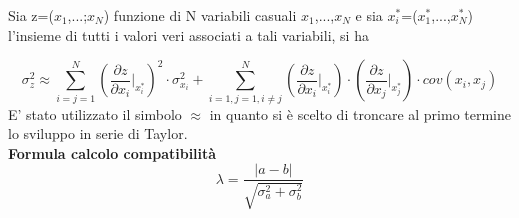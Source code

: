 \documentclass[a4paper,11pt,oneside]{article}
\begin{document}
Sia z=($x_1$,...;$x_N$) funzione di N variabili casuali $x_1$,...,$x_N$ e sia ${x_i^\ast}$=($x_1^\ast$,...,$x_N^{\ast}$) l'insieme di tutti i valori veri associati a tali variabili, si ha 

\begin{equation*}
    \sigma_z^{2}\approx  \sum_{i=j=1}^{N}\left ( \frac{\partial z}{\partial x_i}\Big|_{x_i^{\ast}} \right )^{2}\cdot\sigma_{x_i}^{2} +\sum_{i=1,j=1,i\neq j}^{N}\left (\frac{\partial z }{\partial x_i}\Big|_{x_i^{\ast}} \right ) \cdot \left ( \frac{\partial z}{\partial x_j} \Big|_{x_j^{\ast}} \right )\cdot cov(x_i,x_j)\label{eq:prop_errori}
\end{equation*}
E' stato utilizzato il simbolo $\approx$ in quanto si è scelto di troncare al primo termine lo sviluppo in serie di Taylor.\\


\textbf{Formula calcolo compatibilità}\\
\begin{equation*}
    \lambda=\frac{\left|a-b\right|}{\sqrt{\sigma^{2}_{a}+\sigma^{2}_{b}}}
\end{equation*}\\

\end{document}
